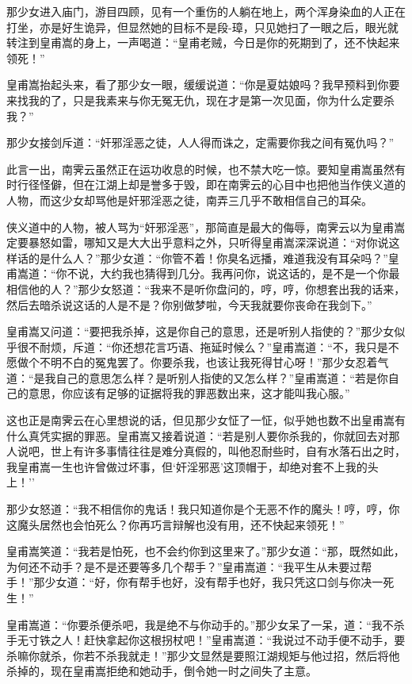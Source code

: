 \documentclass[12pt,oneside]{book}
\begin{document}
那少女进入庙门，游目四顾，见有一个重伤的人躺在地上，两个浑身染血的人正在打坐，亦是好生诡异，但显然她的目标不是段-璋，只见她扫了一眼之后，眼光就转注到皇甫嵩的身上，一声喝道：``皇甫老贼，今日是你的死期到了，还不快起来领死！''

皇甫嵩抬起头来，看了那少女一眼，缓缓说道：``你是夏姑娘吗？我早预料到你要来找我的了，只是我素来与你无冤无仇，现在才是第一次见面，你为什么定要杀我？''

那少女接剑斥道：``奸邪淫恶之徒，人人得而诛之，定需要你我之间有冤仇吗？''

此言一出，南霁云虽然正在运功收息的时候，也不禁大吃一惊。要知皇甫嵩虽然有时行径怪僻，但在江湖上却是誉多于毁，即在南霁云的心目中也把他当作侠义道的人物，而这少女却骂他是奸邪淫恶之徒，南弄三几乎不敢相信自己的耳朵。

侠义道中的人物，被人骂为``奸邪淫恶''，那简直是最大的侮辱，南霁云以为皇甫嵩定要暴怒如雷，哪知又是大大出乎意料之外，只听得皇甫嵩深深说道：``对你说这样话的是什么人？''那少女道：``你管不着！你臭名远播，难道我没有耳朵吗？''皇甫嵩道：``你不说，大约我也猜得到几分。我再问你，说这话的，是不是一个你最相信他的人？''那少女怒道：``我来不是听你盘问的，哼，哼，你想套出我的话来，然后去暗杀说这话的人是不是？你别做梦啦，今天我就要你丧命在我剑下。''

皇甫嵩又问道：``要把我杀掉，这是你自己的意思，还是听别人指使的？''那少女似乎很不耐烦，斥道：``你还想花言巧语、拖延时候么？''皇甫嵩道：``不，我只是不愿做个不明不白的冤鬼罢了。你要杀我，也该让我死得甘心呀！''那少女忍着气道：``是我自己的意思怎么样？是听别人指使的又怎么样？''皇甫嵩道：``若是你自己的意思，你应该有足够的证据将我的罪恶数出来，这才能叫我心服。''

这也正是南霁云在心里想说的话，但见那少女怔了一怔，似乎她也数不出皇甫嵩有什么真凭实据的罪恶。皇甫嵩又接着说道：``若是别人要你杀我的，你就回去对那人说吧，世上有许多事情往往是难分真假的，叫他忍耐些时，自有水落石出之时，我皇甫嵩一生也许曾做过坏事，但`奸淫邪恶'这顶帽于，却绝对套不上我的头上！''

那少女怒道：``我不相信你的鬼话！我只知道你是个无恶不作的魔头！哼，哼，你这魔头居然也会怕死么？你再巧言辩解也没有用，还不快起来领死！''

皇甫嵩笑道：``我若是怕死，也不会约你到这里来了。''那少女道：``那，既然如此，为何还不动手？是不是还要等多几个帮手？''皇甫嵩道：``我平生从未要过帮手！''那少女道：``好，你有帮手也好，没有帮手也好，我只凭这口剑与你决一死生！''

皇甫嵩道：``你要杀便杀吧，我是绝不与你动手的。''那少女呆了一呆，道：``我不杀手无寸铁之人！赶快拿起你这根拐杖吧！''皇甫嵩道：``我说过不动手便不动手，要杀嘛你就杀，你若不杀我就走！''那少文显然是要照江湖规矩与他过招，然后将他杀掉的，现在皇甫嵩拒绝和她动手，倒令她一时之间失了主意。
\end{document}
